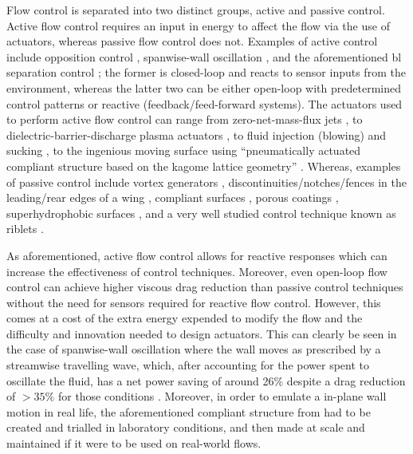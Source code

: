 Flow control is separated into two distinct groups, active and passive control. Active flow control requires an input in energy to affect the flow via the use of actuators, whereas passive flow control does not. Examples of active control include opposition control \cite{choi1994,luhar2014}, spanwise-wall oscillation \cite{jung1992,choi1998,viotti2009}, and the aforementioned \gls{bl} separation control \cite{prandtl1904}; the former is closed-loop and reacts to sensor inputs from the environment, whereas the latter two can be either open-loop with predetermined control patterns or reactive (feedback/feed-forward systems). The actuators used to perform active flow control can range from zero-net-mass-flux jets \cite{zhang2008}, to dielectric-barrier-discharge plasma actuators \cite{wang2013}, to fluid injection (blowing) and sucking \cite{chng2009}, to the ingenious moving surface using ``pneumatically actuated compliant structure based on the kagome lattice geometry'' \cite{bird2018}.
Whereas, examples of passive control include vortex generators \cite{chang1970}, discontinuities/notches/fences in the leading/rear edges of a wing \cite{chang1970}, compliant surfaces \cite{choi1997}, porous coatings \cite{klausmann2017}, superhydrophobic surfaces \cite{truesdell2006}, and a very well studied control technique known as riblets \cite{walsh1983,choi1993,garcia-mayoral2011}.

As aforementioned, active flow control allows for reactive responses which can increase the effectiveness of control techniques. Moreover, even open-loop flow control can achieve higher viscous drag reduction than passive control techniques without the need for sensors required for reactive flow control. However, this comes at a cost of the extra energy expended to modify the flow and the difficulty and innovation needed to design actuators. This can clearly be seen in the case of spanwise-wall oscillation where the wall moves as prescribed by a streamwise travelling wave, which, after accounting for the power spent to oscillate the fluid, has a net power saving of around 26\% despite a drag reduction of $>35\%$ for those conditions \cite{quadrio2009}. Moreover, in order to emulate a in-plane wall motion in real life, the aforementioned compliant structure from \cite{bird2018} had to be created and trialled in laboratory conditions, and then made at scale and maintained if it were to be used on real-world flows.

